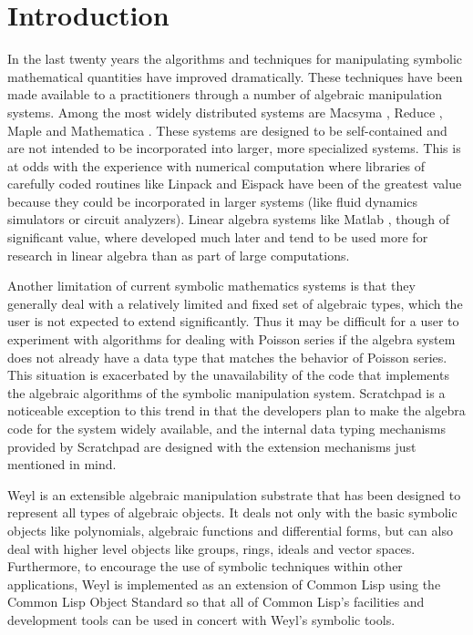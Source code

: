 \chapter{Introduction}
\label{Intro:Chap}


In the last twenty years the algorithms and techniques for manipulating
symbolic mathematical quantities have improved dramatically.  These
techniques have been made available to a practitioners through a number
of algebraic manipulation systems.  Among the most widely distributed
systems are Macsyma \cite{Macsyma:Manual}, Reduce \cite{Reduce:Manual},
Maple \cite{Maple:Manual} and Mathematica \cite{Wolfram88}.
These systems are designed to be self-contained and are not intended to
be incorporated into larger, more specialized systems.  This is at odds
with the experience with numerical computation where libraries of
carefully coded routines like Linpack \cite{LINPACK:Manual} and Eispack
\cite{EISPACK:Manual} have been of the greatest value because they
could be incorporated in larger systems (like fluid dynamics simulators
or circuit analyzers).  Linear algebra systems like Matlab
\cite{Matlab:Manual}, though of significant value, where developed much
later and tend to be used more for research in linear algebra than
as part of large computations.

Another limitation of current symbolic mathematics systems is that they
generally deal with a relatively limited and fixed set of algebraic
types, which the user is not expected to extend significantly.  Thus it
may be difficult for a user to experiment with algorithms for dealing
with Poisson series if the algebra system does not already have a data
type that matches the behavior of Poisson series.  This situation is
exacerbated by the unavailability of the code that implements the
algebraic algorithms of the symbolic manipulation system.  Scratchpad
\cite{Jenks84} is a noticeable exception to this trend in that the
developers plan to make the algebra code for the system widely
available, and the internal data typing mechanisms provided by
Scratchpad are designed with the extension mechanisms just mentioned in
mind.

Weyl is an extensible algebraic manipulation substrate that has been
designed to represent all types of algebraic objects.  It deals not
only with the basic symbolic objects like polynomials, algebraic
functions and differential forms, but can also deal with higher level
objects like groups, rings, ideals and vector spaces.  Furthermore, to
encourage the use of symbolic techniques within other applications,
Weyl is implemented as an extension of Common Lisp
\cite{CommonLisp:Manual} using the Common Lisp Object Standard
\cite{CLOS:Manual} so that all of Common Lisp's facilities and
development tools can be used in concert with Weyl's symbolic tools.

